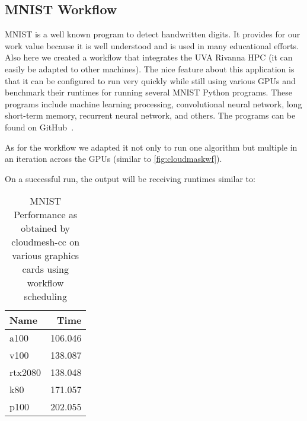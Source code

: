 
\subsection{MNIST Workflow}\label{mnist-workflow}

MNIST is a well known program to detect handwritten digits. It
provides for our work value because it is well understood and is used
in many educational efforts. Also here we created a workflow that
integrates the UVA Rivanna HPC (it can easily be adapted to other machines).
The nice feature about this application is that it can be configured
to run very quickly while still using various GPUs and benchmark their runtimes for running
several MNIST Python programs. These programs include machine learning
processing, convolutional neural network, long short-term memory,
recurrent neural network, and others. The programs can be found on
GitHub~\cite{www-mnist-programs}.

As for the workflow we adapted it not only to run one algorithm but
multiple in an iteration across the GPUs (similar to \ref{fig:cloudmaskwf}).

On a successful run, the output will be receiving runtimes similar to:

\begin{table}[!ht]
\caption{MNIST Performance as obtained by cloudmesh-cc on various graphics cards using workflow scheduling}
    \centering
    \begin{tabular}{lr}
    \hline
        Name & Time \\ \hline
        a100 & 106.046 \\ 
        v100 & 138.087 \\ 
        rtx2080 & 138.048 \\
        k80 & 171.057 \\ 
        p100 & 202.055 \\
    \end{tabular}
    \label{table:mnist-times}
  \end{table}
  
